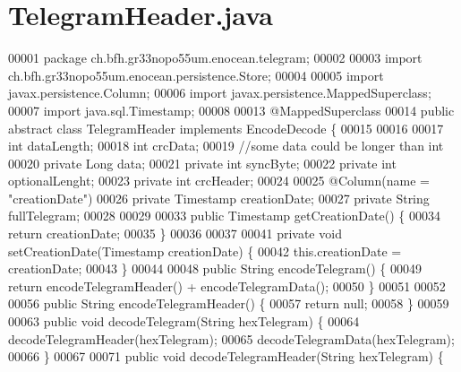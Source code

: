 \section{Telegram\+Header.\+java}
\label{TelegramHeader_8java_source}

\begin{DoxyCode}
00001 \textcolor{keyword}{package }ch.bfh.gr33nopo55um.enocean.telegram;
00002 
00003 \textcolor{keyword}{import} ch.bfh.gr33nopo55um.enocean.persistence.Store;
00004 
00005 \textcolor{keyword}{import} javax.persistence.Column;
00006 \textcolor{keyword}{import} javax.persistence.MappedSuperclass;
00007 \textcolor{keyword}{import} java.sql.Timestamp;
00008 
00013 @MappedSuperclass
00014 \textcolor{keyword}{public} \textcolor{keyword}{abstract} \textcolor{keyword}{class }TelegramHeader \textcolor{keyword}{implements} EncodeDecode \{
00015 
00016 
00017     \textcolor{keywordtype}{int} dataLength;
00018     \textcolor{keywordtype}{int} crcData;
00019     \textcolor{comment}{//some data could be longer than int}
00020     \textcolor{keyword}{private} Long data;
00021     \textcolor{keyword}{private} \textcolor{keywordtype}{int} syncByte;
00022     \textcolor{keyword}{private} \textcolor{keywordtype}{int} optionalLenght;
00023     \textcolor{keyword}{private} \textcolor{keywordtype}{int} crcHeader;
00024 
00025     @Column(name = \textcolor{stringliteral}{"creationDate"})
00026     private Timestamp creationDate;
00027     private String fullTelegram;
00028 
00029 
00033     public Timestamp getCreationDate() \{
00034         \textcolor{keywordflow}{return} creationDate;
00035     \}
00036 
00037 
00041     \textcolor{keyword}{private} \textcolor{keywordtype}{void} setCreationDate(Timestamp creationDate) \{
00042         this.creationDate = creationDate;
00043     \}
00044 
00048     \textcolor{keyword}{public} String encodeTelegram() \{
00049         \textcolor{keywordflow}{return} encodeTelegramHeader() + encodeTelegramData();
00050     \}
00051 
00052 
00056     \textcolor{keyword}{public} String encodeTelegramHeader() \{
00057         \textcolor{keywordflow}{return} null;
00058     \}
00059 
00063     \textcolor{keyword}{public} \textcolor{keywordtype}{void} decodeTelegram(String hexTelegram) \{
00064         decodeTelegramHeader(hexTelegram);
00065         decodeTelegramData(hexTelegram);
00066     \}
00067 
00071     \textcolor{keyword}{public} \textcolor{keywordtype}{void} decodeTelegramHeader(String hexTelegram) \{

\end{DoxyCode}
